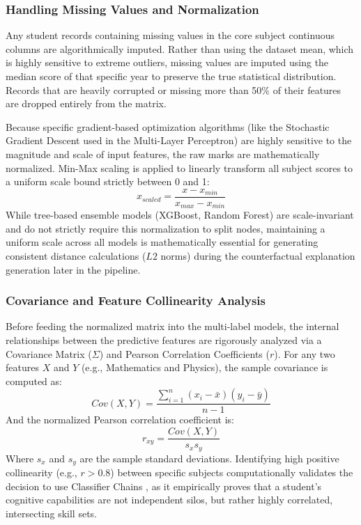 \subsubsection{Handling Missing Values and Normalization}
Any student records containing missing values in the core subject continuous columns are algorithmically imputed. Rather than using the dataset mean, which is highly sensitive to extreme outliers, missing values are imputed using the median score of that specific year to preserve the true statistical distribution. Records that are heavily corrupted or missing more than 50\% of their features are dropped entirely from the matrix.

Because specific gradient-based optimization algorithms (like the Stochastic Gradient Descent used in the Multi-Layer Perceptron) are highly sensitive to the magnitude and scale of input features, the raw marks are mathematically normalized. Min-Max scaling is applied to linearly transform all subject scores to a uniform scale bound strictly between 0 and 1:
\[
x_{scaled} = \frac{x - x_{min}}{x_{max} - x_{min}}
\]
While tree-based ensemble models (XGBoost, Random Forest) are scale-invariant and do not strictly require this normalization to split nodes, maintaining a uniform scale across all models is mathematically essential for generating consistent distance calculations ($L2$ norms) during the counterfactual \parencite{wachter2017counterfactual} explanation generation later in the pipeline.

\subsubsection{Covariance and Feature Collinearity Analysis}
Before feeding the normalized matrix into the multi-label \parencite{tsoumakas2007multi} models, the internal relationships between the predictive features are rigorously analyzed via a Covariance Matrix ($\Sigma$) and Pearson Correlation Coefficients ($r$). For any two features $X$ and $Y$ (e.g., Mathematics and Physics), the sample covariance is computed as:
\[
Cov(X, Y) = \frac{\sum_{i=1}^{n} (x_i - \bar{x})(y_i - \bar{y})}{n - 1}
\]
And the normalized Pearson correlation coefficient is:
\[
r_{xy} = \frac{Cov(X, Y)}{s_x s_y}
\]
Where $s_x$ and $s_y$ are the sample standard deviations. Identifying high positive collinearity (e.g., $r > 0.8$) between specific subjects computationally validates the decision to use Classifier Chains \parencite{read2011classifier}, as it empirically proves that a student's cognitive capabilities are not independent silos, but rather highly correlated, intersecting skill sets.

